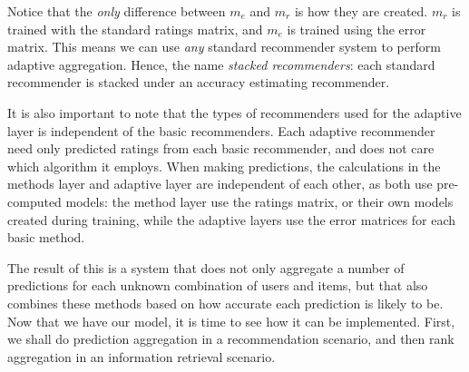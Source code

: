%
%
%

Notice that the \emph{only} difference between $m_e$ and $m_r$ is how they are created.
$m_r$ is trained with the standard ratings matrix, and $m_e$ is trained using the error matrix.
This means we can use \emph{any} standard recommender system to perform adaptive aggregation.
Hence, the name \emph{stacked recommenders}: 
each standard recommender is stacked under an accuracy estimating recommender.

It is also important to note that the types of recommenders used for the adaptive layer
is independent of the basic recommenders.
Each adaptive recommender need only predicted ratings from each basic recommender,
and does not care which algorithm it employs.
When making predictions, the calculations in the methods layer and adaptive layer
are independent of each other, as both use pre-computed models:
the method layer use the ratings matrix, or their own models
created during training, while the adaptive layers use the error matrices for each
basic method.

The result of this is a system that does not only aggregate a number of predictions for each unknown
combination of users and items,
but that also combines these methods based on how accurate each prediction is likely to be.
Now that we have our model, it is time to see how it can be implemented.
First, we shall do prediction aggregation in a recommendation scenario,
and then rank aggregation in an information retrieval scenario.

